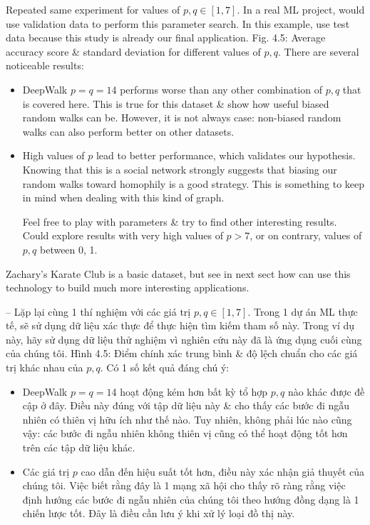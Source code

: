 \documentclass{article}
\begin{document}
\begin{itemize}
\begin{itemize}
        Repeated same experiment for values of $p,q\in[1,7]$. In a real ML project, would use validation data to perform this parameter search. In this example, use test data because this study is already our final application. {\sf Fig. 4.5: Average accuracy score \& standard deviation for different values of $p,q$.} There are several noticeable results:
        \begin{itemize}
            \item DeepWalk $p = q = 1$4 performs worse than any other combination of $p,q$ that is covered here. This is true for this dataset \& show how useful biased random walks can be. However, it is not always case: non-biased random walks can also perform better on other datasets.
            \item High values of $p$ lead to better performance, which validates our hypothesis. Knowing that this is a social network strongly suggests that biasing our random walks toward homophily is a good strategy. This is something to keep in mind when dealing with this kind of graph.

            Feel free to play with parameters \& try to find other interesting results. Could explore results with very high values of $p > 7$, or on contrary, values of $p,q$ between 0, 1.
        \end{itemize}
        Zachary's Karate Club is a basic dataset, but see in next sect how can use this technology to build much more interesting applications.

        -- Lặp lại cùng 1 thí nghiệm với các giá trị $p,q\in[1,7]$. Trong 1 dự án ML thực tế, sẽ sử dụng dữ liệu xác thực để thực hiện tìm kiếm tham số này. Trong ví dụ này, hãy sử dụng dữ liệu thử nghiệm vì nghiên cứu này đã là ứng dụng cuối cùng của chúng tôi. {\sf Hình 4.5: Điểm chính xác trung bình \& độ lệch chuẩn cho các giá trị khác nhau của $p,q$.} Có 1 số kết quả đáng chú ý:
        \begin{itemize}
            \item DeepWalk $p = q = 1$4 hoạt động kém hơn bất kỳ tổ hợp $p,q$ nào khác được đề cập ở đây. Điều này đúng với tập dữ liệu này \& cho thấy các bước đi ngẫu nhiên có thiên vị hữu ích như thế nào. Tuy nhiên, không phải lúc nào cũng vậy: các bước đi ngẫu nhiên không thiên vị cũng có thể hoạt động tốt hơn trên các tập dữ liệu khác.
            \item Các giá trị $p$ cao dẫn đến hiệu suất tốt hơn, điều này xác nhận giả thuyết của chúng tôi. Việc biết rằng đây là 1 mạng xã hội cho thấy rõ ràng rằng việc định hướng các bước đi ngẫu nhiên của chúng tôi theo hướng đồng dạng là 1 chiến lược tốt. Đây là điều cần lưu ý khi xử lý loại đồ thị này.


\end{itemize}
\end{itemize}
\end{itemize}
\end{document}
